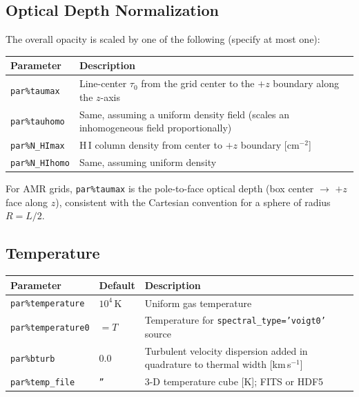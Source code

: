\documentclass[english,a4paper]{my_memo}
\newcommand{\parm}[1]{\texttt{par\%#1}}
\newcommand{\ion}[2]{#1\,{\scriptsize #2}}
\begin{document}
\subsection{Optical Depth Normalization}

The overall opacity is scaled by one of the following (specify at most one):

\begin{center}
\begin{tabular}{L{3.2cm}L{10cm}}
\toprule
Parameter & Description \\
\midrule
\parm{taumax}   & Line-center $\tau_0$ from the grid center to the $+z$ boundary along the $z$-axis \\
\parm{tauhomo}  & Same, assuming a uniform density field (scales an inhomogeneous field proportionally) \\
\parm{N\_HImax} & \ion{H}{I} column density from center to $+z$ boundary [cm$^{-2}$] \\
\parm{N\_HIhomo} & Same, assuming uniform density \\
\bottomrule
\end{tabular}
\end{center}

For AMR grids, \parm{taumax} is the pole-to-face optical depth (box center $\to$ $+z$ face
along $z$), consistent with the Cartesian convention for a sphere of radius $R = L/2$.

\subsection{Temperature}

\begin{center}
\begin{tabular}{@{}l@{\hspace{1.5em}}l@{\hspace{1.5em}}l@{}}
\toprule
Parameter & Default & Description \\
\midrule
\parm{temperature}  & $10^4$\,K & Uniform gas temperature \\
\parm{temperature0} & $= T$ & Temperature for \texttt{spectral\_type='voigt0'} source \\
\parm{bturb}        & 0.0   & Turbulent velocity dispersion added in quadrature to thermal width [km\,s$^{-1}$] \\
\parm{temp\_file}   & \texttt{''} & 3-D temperature cube [K]; FITS or HDF5 \\
\bottomrule
\end{tabular}
\end{center}
\end{document}
